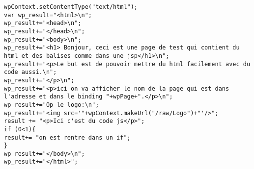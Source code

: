 

\begin{lstlisting}
wpContext.setContentType("text/html");
var wp_result="<html>\n";
wp_result+="<head>\n";
wp_result+="</head>\n";
wp_result+="<body>\n";
wp_result+="<h1> Bonjour, ceci est une page de test qui contient du html et des balises comme dans une jsp</h1>\n";
wp_result+="<p>Le but est de pouvoir mettre du html facilement avec du code aussi.\n";
wp_result+="</p>\n";
wp_result+="<p>ici on va afficher le nom de la page qui est dans l'adresse et dans le binding "+wpPage+".</p>\n";
wp_result+="Op le logo:\n";
wp_result+="<img src='"+wpContext.makeUrl("/raw/Logo")+"'/>";
result += "<p>Ici c'est du code js</p>";
if (0<1){
result+= "on est rentre dans un if";
}
wp_result+="</body>\n";
wp_result+="</html>";
\end{lstlisting}



